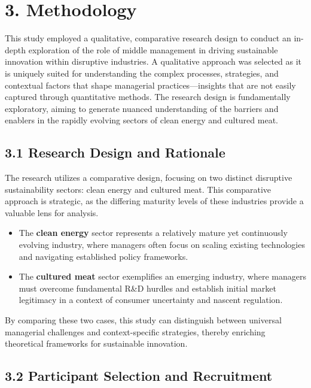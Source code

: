 \section*{3. Methodology}

This study employed a qualitative, comparative research design to conduct an in-depth exploration of the role of middle management in driving sustainable innovation within disruptive industries. A qualitative approach was selected as it is uniquely suited for understanding the complex processes, strategies, and contextual factors that shape managerial practices—insights that are not easily captured through quantitative methods. The research design is fundamentally exploratory, aiming to generate nuanced understanding of the barriers and enablers in the rapidly evolving sectors of clean energy and cultured meat.

\subsection*{3.1 Research Design and Rationale}

The research utilizes a comparative design, focusing on two distinct disruptive sustainability sectors: clean energy and cultured meat. This comparative approach is strategic, as the differing maturity levels of these industries provide a valuable lens for analysis. 
\begin{itemize}
	\item The \textbf{clean energy} sector represents a relatively mature yet continuously evolving industry, where managers often focus on scaling existing technologies and navigating established policy frameworks.
	\item The \textbf{cultured meat} sector exemplifies an emerging industry, where managers must overcome fundamental R\&D hurdles and establish initial market legitimacy in a context of consumer uncertainty and nascent regulation.
\end{itemize}
By comparing these two cases, this study can distinguish between universal managerial challenges and context-specific strategies, thereby enriching theoretical frameworks for sustainable innovation.

\subsection*{3.2 Participant Selection and Recruitment}

